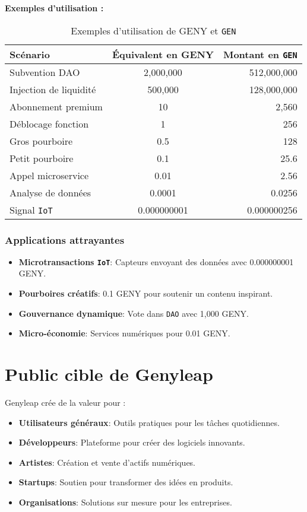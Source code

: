 \documentclass[a4paper,12pt,openany]{book}
\begin{document}
\textbf{Exemples d'utilisation :}
\begin{table}[h]
\centering
\caption{Exemples d'utilisation de GENY et \texttt{GEN}}
\small
\begin{tabular}{l c r}
\hline
\textbf{Scénario} & \textbf{Équivalent en GENY} & \textbf{Montant en \texttt{GEN}} \\
\hline
Subvention DAO & 2,000,000 & 512,000,000 \\
Injection de liquidité & 500,000 & 128,000,000 \\
Abonnement premium & 10 & 2,560 \\
Déblocage fonction & 1 & 256 \\
Gros pourboire & 0.5 & 128 \\
Petit pourboire & 0.1 & 25.6 \\
Appel microservice & 0.01 & 2.56 \\
Analyse de données & 0.0001 & 0.0256 \\
Signal \texttt{IoT} & 0.000000001 & 0.000000256 \\
\hline
\end{tabular}
\end{table}

\subsection*{Applications attrayantes}
\begin{itemize}
    \item \textbf{Microtransactions \texttt{IoT}}: Capteurs envoyant des données avec 0.000000001 GENY.
    \item \textbf{Pourboires créatifs}: 0.1 GENY pour soutenir un contenu inspirant.
    \item \textbf{Gouvernance dynamique}: Vote dans \texttt{DAO} avec 1,000 GENY.
    \item \textbf{Micro-économie}: Services numériques pour 0.01 GENY.
\end{itemize}

\chapter{Public cible de Genyleap}
Genyleap crée de la valeur pour :
\begin{itemize}
    \item \textbf{Utilisateurs généraux}: Outils pratiques pour les tâches quotidiennes.
    \item \textbf{Développeurs}: Plateforme pour créer des logiciels innovants.
    \item \textbf{Artistes}: Création et vente d'actifs numériques.
    \item \textbf{Startups}: Soutien pour transformer des idées en produits.
    \item \textbf{Organisations}: Solutions sur mesure pour les entreprises.
\end{itemize}
\end{document}
